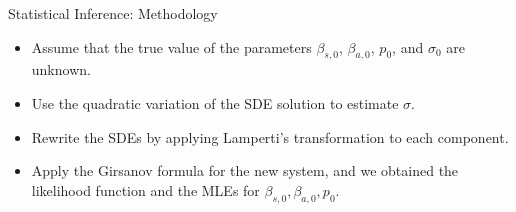 \begin{frame}{Statistical Inference: Methodology}
    \begin{itemize}[label=()]
        \item 
            Assume that the true value of the parameters
            $\beta_{s,0}$, $\beta_{a,0}$, $p_0$, and $\sigma_0$ are unknown.
        \item 
            Use the quadratic variation of the SDE solution to estimate $\sigma$. 
        \item 
            Rewrite the SDEs by applying Lamperti's 
            transformation to each component.
        \item  
            Apply the Girsanov formula 
            for the new system, and we obtained the likelihood function and the MLEs for 
            $\beta_{s,0},\beta_{a,0}, p_0$.
    \end{itemize}
\end{frame}

